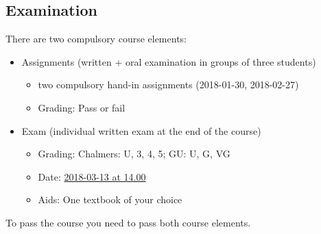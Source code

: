 \documentclass[10pt,a4paper]{article}
\begin{document}
\begin{multicols}{2}
  \subsection{Examination}\label{examination}

  There are two compulsory course elements:

  \begin{itemize}
  \tightlist
  \item
    Assignments (written + oral examination in groups of three students)

    \begin{itemize}
    \tightlist
    \item
      two compulsory hand-in assignments (2018-01-30, 2018-02-27)
    \item
      Grading: Pass or fail
    \end{itemize}
  \item
    Exam (individual written exam at the end of the course)

    \begin{itemize}
    \tightlist
    \item
      Grading: Chalmers: U, 3, 4, 5; GU: U, G, VG
    \item
      Date:
      \href{https://www.student.chalmers.se/sp/course?course_id=26170}{2018-03-13
      at 14.00}
    \item
      Aids: One textbook of your choice
    \end{itemize}
  \end{itemize}

  To pass the course you need to pass both course elements.

\end{multicols}
\end{document}
